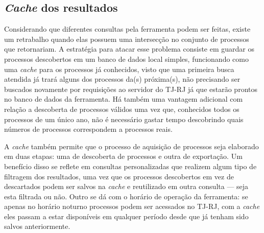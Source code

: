 \subsection{\textit{Cache} dos resultados}

Considerando que diferentes consultas pela ferramenta podem ser feitas, existe
um retrabalho quando elas possuem uma intersecção no conjunto de processos que
retornariam. A estratégia para atacar esse problema consiste em guardar os
processos descobertos em um banco de dados local simples, funcionando como uma
\textit{cache} para os processos já conhecidos, visto que uma primeira
busca atendida já trará alguns dos processos da(s) próxima(s), não precisando
ser buscados novamente por requisições ao servidor do TJ-RJ já que estarão
prontos no banco de dados da ferramenta. Há também uma vantagem adicional com
relação a descoberta de processos válidos uma vez que, conhecidos todos os
processos de um único ano, não é necessário gastar tempo descobrindo quais
números de processos correspondem a processos reais.

A \textit{cache} também permite que o processo de aquisição de processos seja
elaborado em duas etapas: uma de descoberta de processos e outra de exportação.
Um benefício disso se reflete em consultas personalizadas que realizem algum
tipo de filtragem dos resultados, uma vez que os processos descobertos em vez
de descartados podem ser salvos na \textit{cache} e reutilizado em outra
consulta --- seja esta filtrada ou não. Outro se dá com o horário de operação
da ferramenta: se apenas no horário noturno processos podem ser acessados no
TJ-RJ, com a \textit{cache} eles passam a estar disponíveis em qualquer período
desde que já tenham sido salvos anteriormente.
